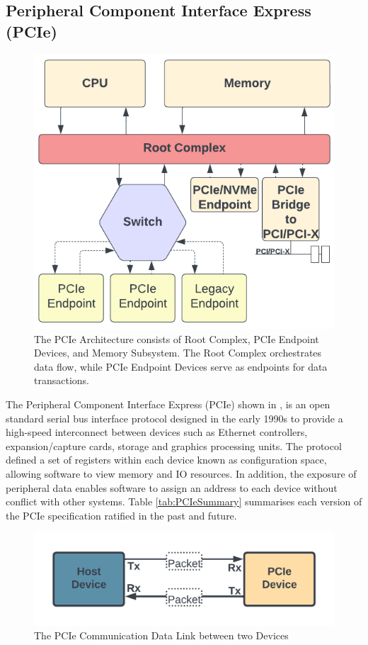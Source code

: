 \subsection{Peripheral Component Interface Express (PCIe)}
\begin{figure}[!h]
\centering
\includegraphics[width=0.6\linewidth]{Images/PCIe.png}
\caption[PCIe Architecture]{The PCIe Architecture consists of Root Complex, PCIe Endpoint Devices, and Memory Subsystem. The Root Complex orchestrates data flow, while PCIe Endpoint Devices serve as endpoints for data transactions.}
\label{fig:PCIe}
\end{figure} 


The Peripheral Component Interface Express (PCIe)\cite{PCIe} shown in , is an open standard serial bus interface protocol designed in the early 1990s to provide a high-speed interconnect between devices such as Ethernet controllers, expansion/capture cards, storage and graphics processing units. The protocol defined a set of registers within each device known as configuration space, allowing software to view memory and IO resources. In addition, the exposure of peripheral data enables software to assign an address to each device without conflict with other systems. Table \ref{tab:PCIeSummary} summarises each version of the PCIe specification ratified in the past and future.


\begin{figure}[h]
\centering
\includegraphics[width=0.9\linewidth]{Images/PCIELink.png}
\caption[PCIe Link]{The PCIe Communication Data Link between two Devices}
\label{fig:PCIeDualSimplexLink}
\end{figure} 



